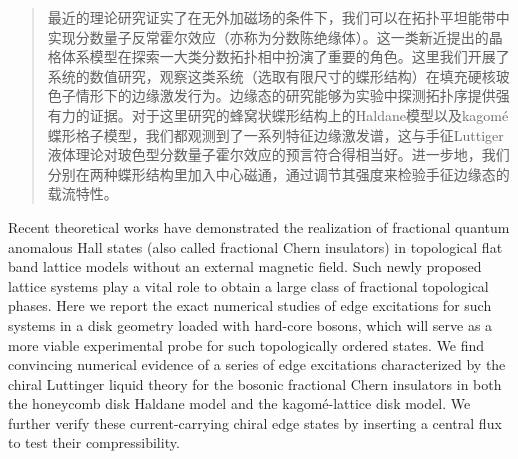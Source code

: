 \begin{abstract}
最近的理论研究证实了在无外加磁场的条件下，我们可以在拓扑平坦能带中实现分数量子反常霍尔效应（亦称为分数陈绝缘体）。这一类新近提出的晶格体系模型在探索一大类分数拓扑相中扮演了重要的角色。这里我们开展了系统的数值研究，观察这类系统（选取有限尺寸的蝶形结构）在填充硬核玻色子情形下的边缘激发行为。边缘态的研究能够为实验中探测拓扑序提供强有力的证据。对于这里研究的蜂窝状蝶形结构上的Haldane模型以及kagom\'{e} 蝶形格子模型，我们都观测到了一系列特征边缘激发谱，这与手征Luttiger液体理论对玻色型分数量子霍尔效应的预言符合得相当好。进一步地，我们分别在两种蝶形结构里加入中心磁通，通过调节其强度来检验手征边缘态的载流特性。

\end{abstract}


\begin{englishabstract}
Recent theoretical works have demonstrated the realization of fractional quantum anomalous Hall states (also called fractional Chern insulators) in topological flat band lattice models without an external magnetic field. Such newly proposed lattice systems play a vital role to obtain a large class of fractional topological phases. Here we report the exact numerical studies of edge excitations for such systems in a disk geometry loaded with hard-core bosons, which will serve as a more viable experimental probe for such topologically ordered states. We find convincing numerical evidence of a series of edge excitations characterized by the chiral Luttinger liquid theory for the bosonic fractional Chern insulators in both the honeycomb disk Haldane model and the kagom\'{e}-lattice disk model. We further verify these current-carrying chiral edge states by inserting a central flux to test their compressibility.

\end{englishabstract}